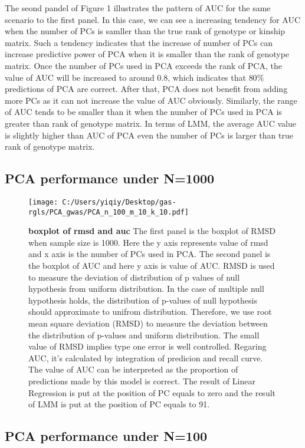 \documentclass[12pt]{article}
\begin{document}
The seond pandel of Figure 1 illustrates the pattern of AUC for the same scenario to the first panel. In this case, we can see a increasing tendency for AUC when the number of PCs is samller than the true rank of genotype or kinship matrix. Such a tendency indicates that the increase of number of PCs can increase predictive power of PCA when it is smaller than the rank of genotype matrix. Once the number of PCs used in PCA exceeds the rank of PCA, the value of AUC will be increased to around 0.8, which indicates that $80\%$ predictions of PCA are correct. After that, PCA does not benefit from adding more PCs as it can not increase the value of AUC obviously. Similarly, the range of AUC tends to be smaller than it when the number of PCs used in PCA is greater than rank of genotype matrix. In terms of LMM, the average AUC value is slightly higher than AUC of PCA even the number of PCs is larger than true rank of genotype matrix. \\


\subsection{PCA performance under N=1000}
\begin{figure}[bp!]
  \centering
  \texttt{[image: C:/Users/yiqiy/Desktop/gas-rgls/PCA\_gwas/PCA\_n\_100\_m\_10\_k\_10.pdf]}
  \caption{
    {\bf boxplot of rmsd and auc}
    The first panel is the boxplot of RMSD when sample size is 1000. Here the y axis represents value of rmsd and x axis is the number of PCs used in PCA.
    The second panel is the boxplot of AUC and here y axis is value of AUC. RMSD is used to measure the deviation of distribution of p values of null hypothesis from uniform distribution. In the case of multiple null hypothesis holds, the distribution of p-values of null hypothesis should approximate to unifrom distribution. Therefore, we use root mean square deviation (RMSD) to measure the deviation between the distribution of p-values and uniform distribution. The small value of RMSD implies type one error is well controlled. Regaring AUC, it's calculated by integration of predicion and recall curve. The value of AUC can be interpreted as the proportion of predictions made by this model is correct. The result of Linear Regression is put at the position of PC equals to zero and the result of LMM is put at the position of PC equals to 91.}
  \label{fig:example}
\end{figure}
\subsection{PCA performance under N=100}
\end{document}
